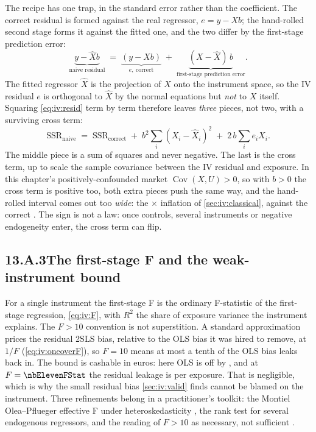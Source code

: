 The recipe has one trap, in the standard error rather than the coefficient. The correct residual is
formed against the real regressor, $e = y - Xb$; the hand-rolled second stage forms it against the
fitted one, and the two differ by the first-stage prediction error:
%
\begin{equation}
  \underbrace{y - \hat X b}_{\text{naive residual}}
  \;=\; \underbrace{(y - Xb)}_{e,\ \text{correct}}
      \;+\; \underbrace{(X - \hat X)\,b}_{\text{first-stage prediction error}} .
  \label{eq:iv:resid}
\end{equation}
%
The fitted regressor $\hat X$ is the projection of $X$ onto the instrument space, so the IV residual
$e$ is orthogonal to $\hat X$ by the normal equations but \emph{not} to $X$ itself. Squaring
\cref{eq:iv:resid} term by term therefore leaves \emph{three} pieces, not two, with a surviving cross
term:
%
\begin{equation}
  \text{SSR}_{\text{naive}} \;=\; \text{SSR}_{\text{correct}}
    \;+\; b^{2}\!\sum_i (X_i - \hat X_i)^{2}
    \;+\; 2\,b\!\sum_i e_i X_i .
  \label{eq:iv:ssr}
\end{equation}
%
The middle piece is a sum of squares and never negative. The last is the cross term, up to scale the
sample covariance between the IV residual and exposure. In this chapter's positively-confounded
market $\operatorname{Cov}(X, U) > 0$, so with $b > 0$ the cross term is positive too, both extra
pieces push the same way, and the hand-rolled interval comes out too \emph{wide}: the
\nbElevenSeHandRatio$\times$ inflation of \cref{sec:iv:classical}, \eur{\nbElevenSeHand} against the
correct \eur{\nbElevenSeCorrect}. The sign is not a law: once controls, several instruments or
negative endogeneity enter, the cross term can flip.

\subsection*{13.A.3\quad The first-stage F and the weak-instrument bound}

For a single instrument the first-stage F is the ordinary F-statistic of the first-stage regression,
\cref{eq:iv:F}, with $R^2$ the share of exposure variance the instrument explains. The $F > 10$
convention \citep{staiger1997, stock2005} is not superstition. A standard approximation prices the
residual 2SLS bias, relative to the OLS bias it was hired to remove, at $1/F$ (\cref{eq:iv:oneoverF}),
so $F = 10$ means at most a tenth of the OLS bias leaks back in. The bound is cashable in euros: here
OLS is off by \eur{\nbElevenNaiveErr}, and at $F = \nbElevenFStat$ the residual leakage is
\eur{\nbElevenFLeak} per exposure. That is negligible, which is why the small residual bias
\cref{sec:iv:valid} finds cannot be blamed on the instrument. Three refinements belong in a
practitioner's toolkit: the Montiel Olea--Pflueger effective F under heteroskedasticity
\citep{olea2013}, the \citet{kleibergen2006} rank test for several endogenous regressors, and the
reading of $F > 10$ as necessary, not sufficient \citep{andrews2019}.

